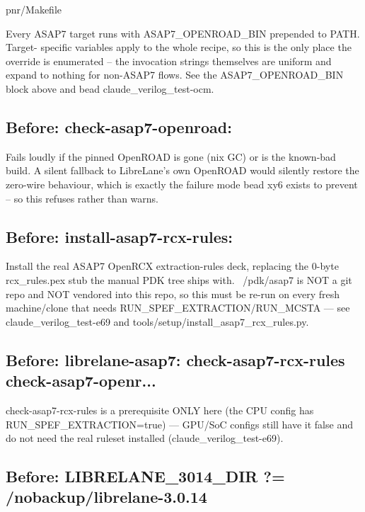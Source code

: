 \begin{relocated}{pnr/Makefile}
\begin{textblock}
Every ASAP7 target runs with ASAP7_OPENROAD_BIN prepended to PATH. Target-
specific variables apply to the whole recipe, so this is the only place the
override is enumerated -- the invocation strings themselves are uniform and
expand to nothing for non-ASAP7 flows. See the ASAP7_OPENROAD_BIN block above
and bead claude_verilog_test-ocm.
\end{textblock}

\subsection*{Before: check-asap7-openroad:}

\begin{textblock}
Fails loudly if the pinned OpenROAD is gone (nix GC) or is the known-bad
build. A silent fallback to LibreLane's own OpenROAD would silently restore
the zero-wire behaviour, which is exactly the failure mode bead xy6 exists to
prevent -- so this refuses rather than warns.
\end{textblock}

\subsection*{Before: install-asap7-rcx-rules:}

\begin{textblock}
Install the real ASAP7 OpenRCX extraction-rules deck, replacing the 0-byte
rcx_rules.pex stub the manual PDK tree ships with. ~/pdk/asap7 is NOT a git
repo and NOT vendored into this repo, so this must be re-run on every fresh
machine/clone that needs RUN_SPEF_EXTRACTION/RUN_MCSTA — see
claude_verilog_test-e69 and tools/setup/install_asap7_rcx_rules.py.
\end{textblock}

\subsection*{Before: librelane-asap7: check-asap7-rcx-rules check-asap7-openr...}

\begin{textblock}
check-asap7-rcx-rules is a prerequisite ONLY here (the CPU config has
RUN_SPEF_EXTRACTION=true) — GPU/SoC configs still have it false and do not
need the real ruleset installed (claude_verilog_test-e69).
\end{textblock}

\subsection*{Before: LIBRELANE\_3014\_DIR  ?= /nobackup/librelane-3.0.14}


\end{relocated}
